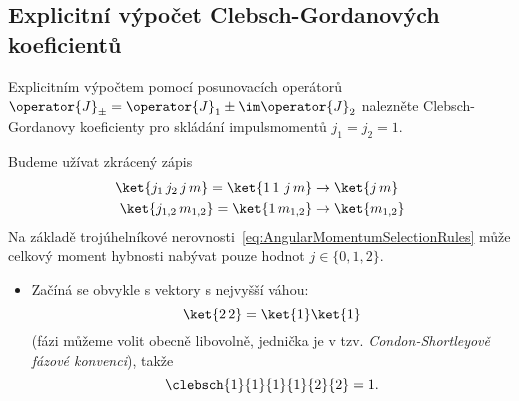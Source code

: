 \subsection[Explicitní výpočet C-G koeficientů]{Explicitní výpočet Clebsch-Gordanových koeficientů}
Explicitním výpočtem pomocí posunovacích operátorů $\operator{J}_{\pm}=\operator{J}_{1}\pm\im\operator{J}_{2}$ 
nalezněte Clebsch-Gordanovy koeficienty pro skládání impulsmomentů $j_{1}=j_{2}=1$.

\begin{solution}
	Budeme užívat zkrácený zápis
	\begin{subequations}
		\begin{align}
			\ket{j_{1}\,j_{2}\,j\,m}
				=\ket{1\,1\,\,j\,m}
				&\rightarrow\ket{j\,m}\\
			\ket{j_{1,2}\,m_{1,2}}
				=\ket{1\,m_{1,2}}
				&\rightarrow\ket{m_{1,2}}
		\end{align}
	\end{subequations}
	Na základě trojúhelníkové nerovnosti~\eqref{eq:AngularMomentumSelectionRules} může celkový moment hybnosti nabývat pouze hodnot $j\in\{0,1,2\}$.

	\begin{itemize}
	\item 
		Začíná se obvykle s vektory s nejvyšší váhou:
		\begin{equation}
			\label{eq:AngularMomentum22}
			\ket{2\,2}
				=\ket{1}\ket{1}
		\end{equation}
		(fázi můžeme volit obecně libovolně, jednička je v tzv. 
		\emph{Condon-Shortleyově fázové konvenci}), takže
		\begin{equation}
			\clebsch{1}{1}{1}{1}{2}{2}
				=1.
		\end{equation}
	

\end{itemize}
\end{solution}
